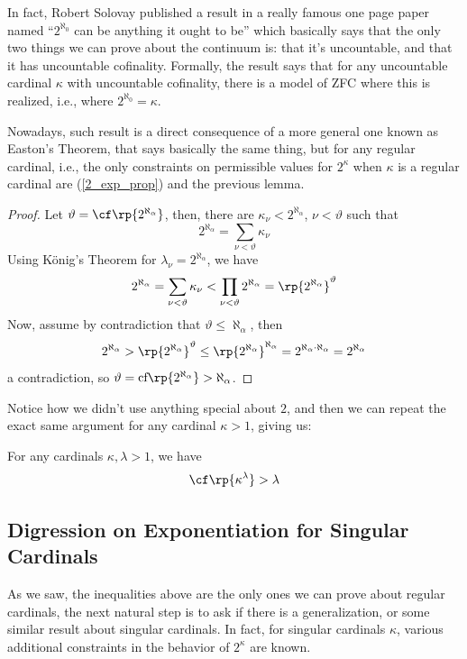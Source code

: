 In fact, Robert Solovay published a result in a really famous one page paper named ``$2^{\aleph_0}$ can be anything it ought to be'' which basically says that the only two things we can prove about the continuum is: that it's uncountable, and that it has uncountable cofinality. Formally, the result says that for any uncountable cardinal $\kappa$ with uncountable cofinality, there is a model of ZFC where this is realized, i.e., where $2^{\aleph_0}=\kappa$.

Nowadays, such result is a direct consequence of a more general one known as Easton's Theorem, that says basically the same thing, but for any regular cardinal, i.e., the only constraints on permissible values for $2^\kappa$ when $\kappa$ is a regular cardinal are (\ref{2_exp_prop}) and the previous lemma.

\begin{proof}
    Let $\vartheta=\cf\rp{2^{\aleph_\alpha}}$, then, there are $\kappa_\nu<2^{\aleph_\alpha}$, $\nu<\vartheta$ such that
    $$2^{\aleph_\alpha}=\sum_{\nu<\vartheta}\kappa_\nu$$
    Using König's Theorem for $\lambda_\nu=2^{\aleph_\alpha}$, we have
    $$2^{\aleph_\alpha}=\sum_{\nu<\vartheta}\kappa_\nu<\prod_{\nu<\vartheta}2^{\aleph_\alpha}=\rp{2^{\aleph_\alpha}}^\vartheta$$
    Now, assume by contradiction that $\vartheta\leq\aleph_\alpha$, then
    $$2^{\aleph_\alpha}>\rp{2^{\aleph_\alpha}}^\vartheta\leq\rp{2^{\aleph_\alpha}}^{\aleph_\alpha}=2^{\aleph_\alpha\cdot\aleph_\alpha}=2^{\aleph_\alpha}$$
    a contradiction, so $\vartheta=\text{cf}\rp{2^{\aleph_\alpha}}>\aleph_\alpha$.
\end{proof}

Notice how we didn't use anything special about $2$, and then we can repeat the exact same argument for any cardinal $\kappa>1$, giving us:

\begin{corollary}{}{}\label{cf(kl)>l}
    For any cardinals $\kappa,\lambda>1$, we have
    $$\cf\rp{\kappa^\lambda}>\lambda$$
\end{corollary}

\subsection{Digression on Exponentiation for Singular Cardinals}

As we saw, the inequalities above are the only ones we can prove about regular cardinals, the next natural step is to ask if there is a generalization, or some similar result about singular cardinals. In fact, for singular cardinals $\kappa$, various additional constraints in the behavior of $2^\kappa$ are known.

